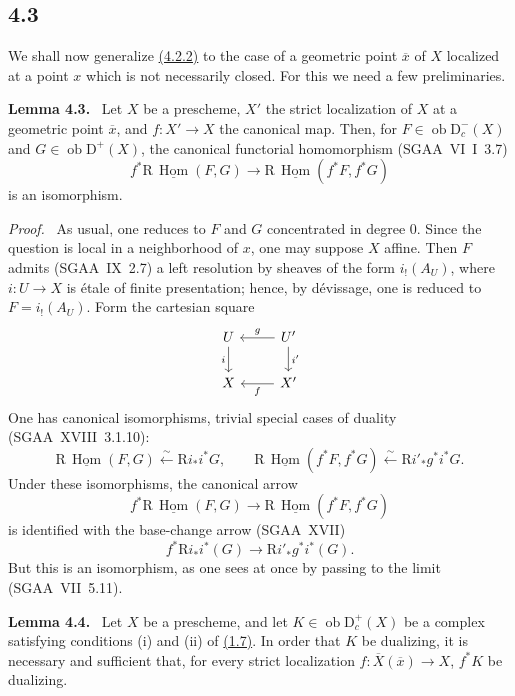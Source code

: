 \documentclass[11pt]{article}
\newenvironment{statement}[1]{\par\medskip\noindent\textbf{#1.}\ }{\par\medskip}
\newenvironment{prooftext}[1][Proof]{\par\noindent\emph{#1.}\ }{\par\medskip}
\DeclareMathOperator{\Hom}{Hom}
\newcommand{\R}{\mathrm{R}}
\newcommand{\D}{\mathrm{D}}
\newcommand{\ob}{\operatorname{ob}}
\newcommand{\ol}[1]{\overline{#1}}
\providecommand{\Hom}{\operatorname{Hom}}
\providecommand{\ob}{\operatorname{ob}}
\providecommand{\R}{\mathrm R}
\providecommand{\Hom}{\operatorname{Hom}}
\begin{document}
\subsection*{4.3}\label{sga5:I:subsection:4.3}
We shall now generalize \hyperref[sga5:I:equation:4.2.2]{(4.2.2)} to the case of a geometric point $\ol{x}$ of $X$ localized at a point $x$ which is not necessarily closed. For this we need a few preliminaries.

\label{sga5:I:lemma:4.3}\begin{statement}{Lemma 4.3}
Let $X$ be a prescheme, $X'$ the strict localization of $X$ at a geometric point $\ol{x}$, and $f:X'\to X$ the canonical map. Then, for $F\in\ob\D_c^-(X)$ and $G\in\ob\D^+(X)$, the canonical functorial homomorphism (SGAA~VI~I~3.7)
\[
f^*\R\,\underline{\Hom}(F,G)\longrightarrow \R\,\underline{\Hom}(f^*F,f^*G)
\]
is an isomorphism.
\end{statement}

\begin{prooftext}[Proof]
As usual, one reduces to $F$ and $G$ concentrated in degree $0$. Since the question is local in a neighborhood of $x$, one may suppose $X$ affine. Then $F$ admits (SGAA~IX~2.7) a left resolution by sheaves of the form $i_!(A_U)$, where $i:U\to X$ is étale of finite presentation; hence, by dévissage, one is reduced to $F=i_!(A_U)$. Form the cartesian square
\[
\begin{tikzcd}
U \arrow[d,"i"'] & U' \arrow[l,"g"'] \arrow[d,"i'"] \\
X & X' \arrow[l,"f"]
\end{tikzcd}
\]
One has canonical isomorphisms, trivial special cases of duality (SGAA~XVIII~3.1.10):
\[
\R\,\underline{\Hom}(F,G)\xleftarrow{\sim}\R i_* i^*G,
\qquad
\R\,\underline{\Hom}(f^*F,f^*G)\xleftarrow{\sim}\R i'_* g^*i^*G.
\]
Under these isomorphisms, the canonical arrow
\[
f^*\R\,\underline{\Hom}(F,G)\longrightarrow \R\,\underline{\Hom}(f^*F,f^*G)
\]
is identified with the base-change arrow (SGAA~XVII)
\[
f^*\R i_*i^*(G)\longrightarrow \R i'_*g^*i^*(G).
\]
But this is an isomorphism, as one sees at once by passing to the limit (SGAA~VII~5.11).
\end{prooftext}

\label{sga5:I:lemma:4.4}\begin{statement}{Lemma 4.4}
Let $X$ be a prescheme, and let $K\in\ob\D_c^+(X)$ be a complex satisfying conditions (i) and (ii) of \hyperref[sga5:I:definition:1.7]{(1.7)}. In order that $K$ be dualizing, it is necessary and sufficient that, for every strict localization $f:\ol{X}(\ol{x})\to X$, $f^*K$ be dualizing.
\end{statement}
\end{document}
